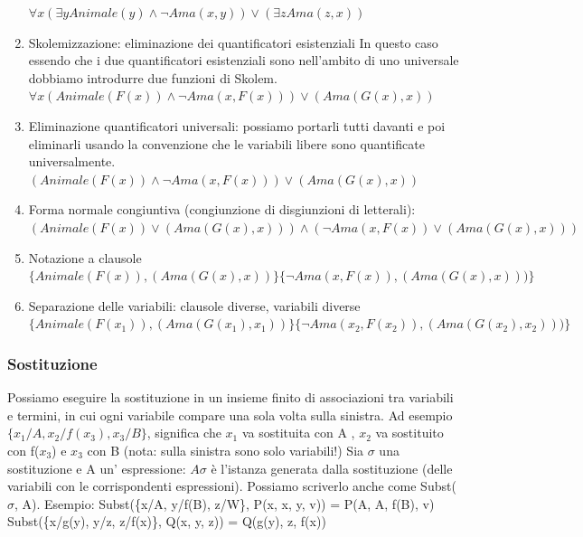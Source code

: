 \documentclass{article}
\begin{document}
\begin{enumerate}
    $\forall x (\exists y Animale(y) \land \neg Ama(x,y)) \lor (\exists z Ama(z, x))$
    \item Skolemizzazione: eliminazione dei quantificatori esistenziali \newline
    In questo caso essendo che i due quantificatori esistenziali sono nell'ambito di uno universale dobbiamo introdurre due funzioni di Skolem. \newline
    $\forall x (Animale(F(x)) \land \neg Ama(x,F(x))) \lor (Ama(G(x), x))$
    \item Eliminazione quantificatori universali: possiamo portarli tutti davanti e poi eliminarli usando la convenzione che le variabili libere sono quantificate universalmente. \newline
    $(Animale(F(x)) \land \neg Ama(x,F(x))) \lor (Ama(G(x), x))$
    \item Forma normale congiuntiva (congiunzione di disgiunzioni di letterali): \newline
    $(Animale(F(x)) \lor (Ama(G(x), x))) \land (\neg Ama(x,F(x)) \lor (Ama(G(x), x)))$
    \item Notazione a clausole \newline
    $\{Animale(F(x)),(Ama(G(x), x))\} \{\neg Ama(x,F(x)),(Ama(G(x), x)))\}$
    \item Separazione delle variabili: clausole diverse, variabili diverse \newline
    $\{Animale(F(x_1)),(Ama(G(x_1), x_1))\} \{\neg Ama(x_2,F(x_2)),(Ama(G(x_2), x_2)))\}$
\end{enumerate}

\subsubsection{Sostituzione}
Possiamo eseguire la sostituzione in un insieme finito di associazioni tra variabili e termini, in cui ogni variabile compare una sola volta sulla sinistra. Ad esempio $\{x_1/A, x_2/f(x_3), x_3/B\}$, significa che $x_1$ va sostituita con A , $x_2$ va sostituito con f($x_3$) e $x_3$ con B (nota: sulla sinistra sono solo variabili!)\newline
Sia $\sigma$ una sostituzione e A un' espressione: $A \sigma$ è l'istanza generata dalla sostituzione (delle variabili con le corrispondenti espressioni). Possiamo scriverlo anche come Subst($\sigma$, A). Esempio: \newline
Subst(\{x/A, y/f(B), z/W\}, P(x, x, y, v)) = P(A, A, f(B), v) \newline
Subst(\{x/g(y), y/z, z/f(x)\}, Q(x, y, z)) = Q(g(y), z, f(x)) \newline
\end{document}
